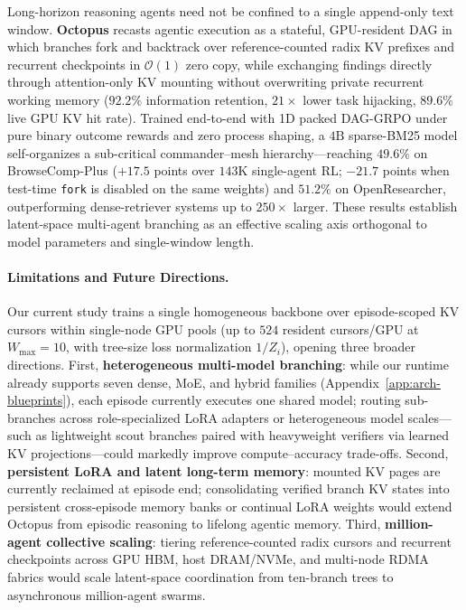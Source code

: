 \documentclass{article}
\begin{document}
Long-horizon reasoning agents need not be confined to a single append-only text window. \textbf{Octopus} recasts agentic execution as a stateful, GPU-resident DAG in which branches fork and backtrack over reference-counted radix KV prefixes and recurrent checkpoints in $\mathcal{O}(1)$ zero copy, while exchanging findings directly through attention-only KV mounting without overwriting private recurrent working memory ($92.2\%$ information retention, $21\times$ lower task hijacking, $89.6\%$ live GPU KV hit rate). Trained end-to-end with 1D packed DAG-GRPO under pure binary outcome rewards and zero process shaping, a $4\text{B}$ sparse-BM25 model self-organizes a sub-critical commander--mesh hierarchy---reaching $49.6\%$ on BrowseComp-Plus ($+17.5$ points over $143\text{K}$ single-agent RL; $-21.7$ points when test-time \texttt{fork} is disabled on the same weights) and $51.2\%$ on OpenResearcher, outperforming dense-retriever systems up to $250\times$ larger. These results establish latent-space multi-agent branching as an effective scaling axis orthogonal to model parameters and single-window length.

\paragraph{Limitations and Future Directions.}
Our current study trains a single homogeneous backbone over episode-scoped KV cursors within single-node GPU pools (up to $524$ resident cursors/GPU at $W_{\max}=10$, with tree-size loss normalization $1/Z_i$), opening three broader directions. First, \textbf{heterogeneous multi-model branching}: while our runtime already supports seven dense, MoE, and hybrid families (Appendix~\ref{app:arch-blueprints}), each episode currently executes one shared model; routing sub-branches across role-specialized LoRA adapters or heterogeneous model scales---such as lightweight scout branches paired with heavyweight verifiers via learned KV projections---could markedly improve compute--accuracy trade-offs. Second, \textbf{persistent LoRA and latent long-term memory}: mounted KV pages are currently reclaimed at episode end; consolidating verified branch KV states into persistent cross-episode memory banks or continual LoRA weights would extend Octopus from episodic reasoning to lifelong agentic memory. Third, \textbf{million-agent collective scaling}: tiering reference-counted radix cursors and recurrent checkpoints across GPU HBM, host DRAM/NVMe, and multi-node RDMA fabrics would scale latent-space coordination from ten-branch trees to asynchronous million-agent swarms.
\end{document}
